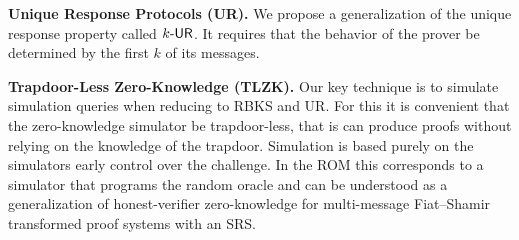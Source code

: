 \documentclass[11pt]{llncs}
\newcommand{\oursubsub}[1] {\smallskip\noindent\textbf{#1}}
\begin{document}

\oursubsub{Unique Response Protocols (UR).}  
We propose a generalization of the unique response property called ${k\text{-}\mathsf{UR}}$. It requires that the behavior of the prover be determined by the first
$k$ of its messages. 

\oursubsub{Trapdoor-Less Zero-Knowledge (TLZK).} 
Our key technique is to simulate simulation queries when reducing to RBKS and UR. For this it is convenient that the zero-knowledge simulator be trapdoor-less, that is can produce proofs without relying on the
knowledge of the trapdoor. Simulation is based purely on the simulators early control over the challenge. 
%
In the ROM this corresponds to a simulator that programs the random oracle and can be understood as a generalization of
honest-verifier zero-knowledge for multi-message Fiat--Shamir transformed proof systems with an
SRS. 
\end{document}
